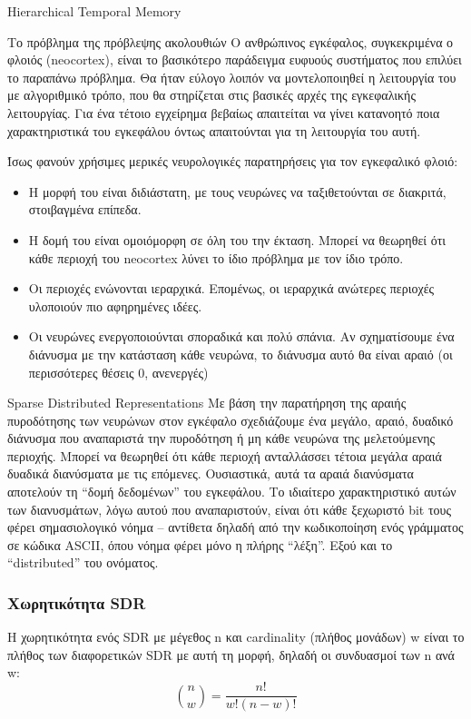 \documentclass[a4paper,11pt]{article}
\begin{document}
\begin{section}{Hierarchical Temporal Memory}
\begin{subsection}{Το πρόβλημα της πρόβλεψης ακολουθιών}
	Ο ανθρώπινος εγκέφαλος, συγκεκριμένα ο φλοιός (neocortex), είναι το βασικότερο παράδειγμα ευφυούς συστήματος που επιλύει το παραπάνω πρόβλημα. Θα ήταν εύλογο λοιπόν να μοντελοποιηθεί η λειτουργία του με αλγοριθμικό τρόπο, που θα στηρίζεται στις βασικές αρχές της εγκεφαλικής λειτουργίας. Για ένα τέτοιο εγχείρημα βεβαίως απαιτείται να γίνει κατανοητό ποια χαρακτηριστικά του εγκεφάλου όντως απαιτούνται για τη λειτουργία του αυτή.

	Ίσως φανούν χρήσιμες μερικές νευρολογικές παρατηρήσεις για τον εγκεφαλικό φλοιό:
	\begin{itemize}
	  \item Η μορφή του είναι διδιάστατη, με τους νευρώνες να ταξιθετούνται σε διακριτά, στοιβαγμένα επίπεδα.
	  \item Η δομή του είναι ομοιόμορφη σε όλη του την έκταση. Μπορεί να θεωρηθεί ότι κάθε περιοχή του neocortex λύνει το ίδιο πρόβλημα με τον ίδιο τρόπο.
	  \item Οι περιοχές ενώνονται ιεραρχικά. Επομένως, οι ιεραρχικά ανώτερες περιοχές υλοποιούν πιο αφηρημένες ιδέες.
	  \item Οι νευρώνες ενεργοποιούνται σποραδικά και πολύ σπάνια. Αν σχηματίσουμε ένα διάνυσμα με την κατάσταση κάθε νευρώνα, το διάνυσμα αυτό θα είναι αραιό (οι περισσότερες θέσεις 0, ανενεργές)
	\end{itemize}
  \end{subsection}

  \begin{subsection}{Sparse Distributed Representations}
	Με βάση την παρατήρηση της αραιής πυροδότησης των νευρώνων στον εγκέφαλο σχεδιάζουμε ένα μεγάλο, αραιό, δυαδικό διάνυσμα που αναπαριστά την πυροδότηση ή μη κάθε νευρώνα της μελετούμενης περιοχής. Μπορεί να θεωρηθεί ότι κάθε περιοχή ανταλλάσσει τέτοια μεγάλα αραιά δυαδικά διανύσματα με τις επόμενες. Ουσιαστικά, αυτά τα αραιά διανύσματα αποτελούν τη ``δομή δεδομένων'' \cite{neuronssynapses,sdrkanerva} του εγκεφάλου. Το ιδιαίτερο χαρακτηριστικό αυτών των διανυσμάτων, λόγω αυτού που αναπαριστούν, είναι ότι κάθε ξεχωριστό bit τους φέρει σημασιολογικό νόημα -- αντίθετα δηλαδή από την κωδικοποίηση ενός γράμματος σε κώδικα ASCII, όπου νόημα φέρει μόνο η πλήρης ``λέξη''. Εξού και το ``distributed'' του ονόματος.

	\subsubsection{Χωρητικότητα SDR}
	Η χωρητικότητα ενός SDR με μέγεθος n και cardinality (πλήθος μονάδων) w είναι το πλήθος των διαφορετικών SDR με αυτή τη μορφή, δηλαδή οι συνδυασμοί των n ανά w: $$ \binom nw= \frac{n!}{w!(n-w)!} $$


\end{subsection}
\end{section}
\end{document}

